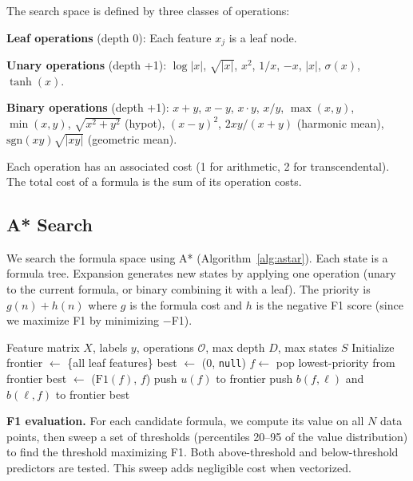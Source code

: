 \documentclass[11pt,a4paper]{article}
\begin{document}
The search space is defined by three classes of operations:

\textbf{Leaf operations} (depth 0): Each feature $x_j$ is a leaf node.

\textbf{Unary operations} (depth +1): $\log|x|$, $\sqrt{|x|}$, $x^2$,
$1/x$, $-x$, $|x|$, $\sigma(x)$, $\tanh(x)$.

\textbf{Binary operations} (depth +1): $x + y$, $x - y$, $x \cdot y$,
$x / y$, $\max(x, y)$, $\min(x, y)$, $\sqrt{x^2 + y^2}$ (hypot),
$(x - y)^2$, $2xy/(x+y)$ (harmonic mean), $\mathrm{sgn}(xy)\sqrt{|xy|}$
(geometric mean).

Each operation has an associated cost (1 for arithmetic, 2 for
transcendental). The total cost of a formula is the sum of its
operation costs.

\subsection{A* Search}

We search the formula space using A* (Algorithm~\ref{alg:astar}).
Each state is a formula tree. Expansion generates new states by
applying one operation (unary to the current formula, or binary
combining it with a leaf). The priority is $g(n) + h(n)$ where
$g$ is the formula cost and $h$ is the negative F1 score (since
we maximize F1 by minimizing $-$F1).

\begin{algorithm}[t]
\caption{A* Symbolic Discovery}
\label{alg:astar}
\begin{algorithmic}[1]
\Require Feature matrix $X$, labels $y$, operations $\mathcal{O}$,
max depth $D$, max states $S$
\State Initialize frontier $\gets$ \{all leaf features\}
\State best $\gets$ (0, \texttt{null})
    \State $f \gets$ pop lowest-priority from frontier
        \State best $\gets$ ($\mathrm{F1}(f)$, $f$)
    \EndIf
            \State push $u(f)$ to frontier
        \EndFor
            \State push $b(f, \ell)$ and $b(\ell, f)$ to frontier
        \EndFor
    \EndIf
\EndWhile
\State \Return best
\end{algorithmic}
\end{algorithm}

\textbf{F1 evaluation.} For each candidate formula, we compute its
value on all $N$ data points, then sweep a set of thresholds
(percentiles 20--95 of the value distribution) to find the threshold
maximizing F1. Both above-threshold and below-threshold predictors
are tested. This sweep adds negligible cost when vectorized.
\end{document}
